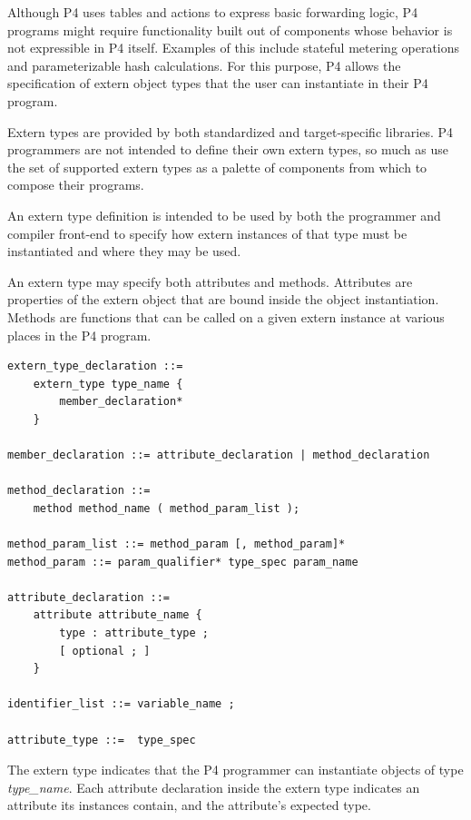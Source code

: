 \documentclass[12pt]{article}
\begin{document}

Although P4 uses \matchaction tables and actions to express basic forwarding
logic, P4 programs might require functionality built out of components
whose behavior is not expressible in P4 itself. Examples of this include
stateful metering operations and parameterizable hash calculations. For this
purpose, P4 allows the specification of extern object types that the
user can instantiate in their P4 program.

Extern types are provided by both standardized and target-specific libraries.
P4 programmers are not intended to define their own extern types, so much
as use the set of supported extern types as a palette of components from which
to compose their programs. 

 An extern type definition is intended to be 
used by both the programmer and compiler front-end to specify how extern
instances of that type must be instantiated and where they may be used.

An extern type may specify both attributes and methods. Attributes are
properties of the extern object that are bound inside the object
instantiation. Methods are functions that can be called on a given extern
instance at various places in the P4 program.

\begin{lstlisting}[style=BNFstyle]
extern_type_declaration ::= 
    extern_type type_name {
        member_declaration*
    }

member_declaration ::= attribute_declaration | method_declaration

method_declaration ::= 
    method method_name ( method_param_list );

method_param_list ::= method_param [, method_param]*
method_param ::= param_qualifier* type_spec param_name

attribute_declaration ::= 
    attribute attribute_name {
        type : attribute_type ;
        [ optional ; ]
    }

identifier_list ::= variable_name ;

attribute_type ::=  type_spec
\end{lstlisting}

The extern type indicates that the P4 programmer can instantiate objects of
type \textit{type_name}. Each attribute declaration inside the extern type 
indicates an attribute its instances contain, and the attribute's expected type.
\end{document}
